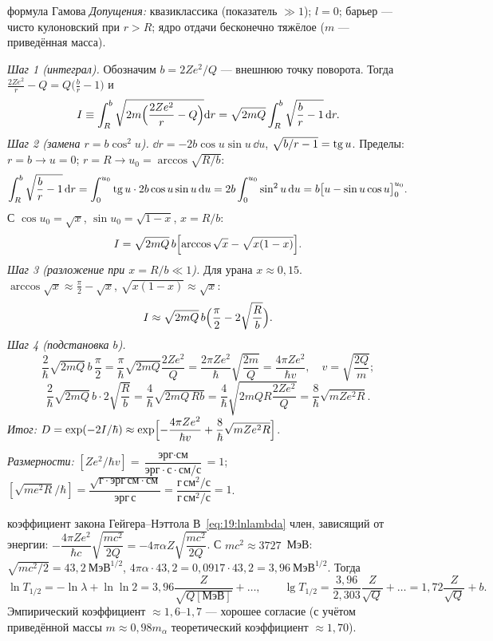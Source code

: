 \begin{derivation}[label=der:19:gamow]{формула Гамова}
\emph{Допущения:} квазиклассика (показатель $\gg1$); $l=0$; барьер — чисто кулоновский при $r>R$; ядро отдачи бесконечно тяжёлое
($m$ — приведённая масса).

\emph{Шаг 1 (интеграл).} Обозначим $b=2Ze^2/Q$ — внешнюю точку поворота. Тогда $\frac{2Ze^2}{r}-Q=Q\bigl(\frac br-1\bigr)$ и
\[
  I\equiv\int_R^b\sqrt{2m\Bigl(\frac{2Ze^2}{r}-Q\Bigr)}\mathrm{d} r=\sqrt{2mQ}\int_R^b\sqrt{\frac br-1}\,\mathrm{d} r .
\]
\emph{Шаг 2 (замена $r=b\cos^2u$).} $\dd r=-2b\cos u\sin u\,\dd u$, $\sqrt{b/r-1}=\operatorname{tg} u$. Пределы: $r=b\to u=0$; $r=R\to u_0=\arccos\sqrt{R/b}$:
\[
  \int_R^b\sqrt{\frac br-1}\,\mathrm{d} r=\int_0^{u_0}\operatorname{tg} u\cdot2b\cos u\sin u\,\mathrm{d} u=2b\int_0^{u_0}\sin^2u\,\mathrm{d} u
  =b\bigl[u-\sin u\cos u\bigr]_0^{u_0}.
\]
С $\cos u_0=\sqrt{x}$, $\sin u_0=\sqrt{1-x}$, $x=R/b$:
\[
  I=\sqrt{2mQ}\,b\Bigl[\arccos\sqrt{x}-\sqrt{x(1-x)}\Bigr].
\]
\emph{Шаг 3 (разложение при $x=R/b\ll1$).} Для урана $x\approx0{,}15$. $\arccos\sqrt x\approx\frac\pi2-\sqrt x$, $\sqrt{x(1-x)}\approx\sqrt x$:
\[
  I\approx\sqrt{2mQ}\,b\Bigl(\frac\pi2-2\sqrt{\frac Rb}\Bigr).
\]
\emph{Шаг 4 (подстановка $b$).}
\[
  \frac2\hbar\sqrt{2mQ}\,b\,\frac\pi2=\frac{\pi}{\hbar}\sqrt{2mQ}\frac{2Ze^2}{Q}=\frac{2\pi Ze^2}{\hbar}\sqrt{\frac{2m}{Q}}=\frac{4\pi Ze^2}{\hbar v},
  \quad v=\sqrt{\frac{2Q}{m}};
\]
\[
  \frac2\hbar\sqrt{2mQ}\,b\cdot2\sqrt{\frac Rb}=\frac4\hbar\sqrt{2mQ\,Rb}=\frac4\hbar\sqrt{2mQR\frac{2Ze^2}{Q}}=\frac8\hbar\sqrt{mZe^2R}.
\]
\emph{Итог:} $D=\exp(-2I/\hbar)\approx\exp\Bigl[-\dfrac{4\pi Ze^2}{\hbar v}+\dfrac8\hbar\sqrt{mZe^2R}\Bigr]$.

\emph{Размерности:} $[Ze^2/\hbar v]=\dfrac{\text{эрг}\cdot\text{см}}{\text{эрг}\cdot\text{с}\cdot\text{см}/\text{с}}=1$; $[\sqrt{me^2R}/\hbar]=\dfrac{\sqrt{\text{г}\cdot\text{эрг}\,\text{см}\cdot\text{см}}}{\text{эрг}\,\text{с}}=\dfrac{\text{г}\,\text{см}^2/\text{с}}{\text{г}\,\text{см}^2/\text{с}}=1$.
\end{derivation}

\begin{derivation}[label=der:19:coef]{коэффициент закона Гейгера--Нэттола}
В~\eqref{eq:19:lnlambda} член, зависящий от энергии: $-\dfrac{4\pi Ze^2}{\hbar c}\sqrt{\dfrac{mc^2}{2Q}}=-4\pi\alpha Z\sqrt{\dfrac{mc^2}{2Q}}$. С $mc^2\approx3727$~МэВ:
$\sqrt{mc^2/2}=43{,}2\ \text{МэВ}^{1/2}$, $4\pi\alpha\cdot43{,}2=0{,}0917\cdot43{,}2=3{,}96\ \text{МэВ}^{1/2}$. Тогда
\[
  \ln T_{1/2}=-\ln\lambda+\ln\ln2=3{,}96\frac{Z}{\sqrt{Q[\text{МэВ}]}}+\dots,\qquad
  \lg T_{1/2}=\frac{3{,}96}{2{,}303}\frac{Z}{\sqrt Q}+\dots=1{,}72\frac{Z}{\sqrt Q}+b .
\]
Эмпирический коэффициент $\approx1{,}6$--$1{,}7$ — хорошее согласие (с учётом приведённой массы $m\approx0{,}98m_\alpha$ теоретический
коэффициент $\approx1{,}70$).
\end{derivation}

